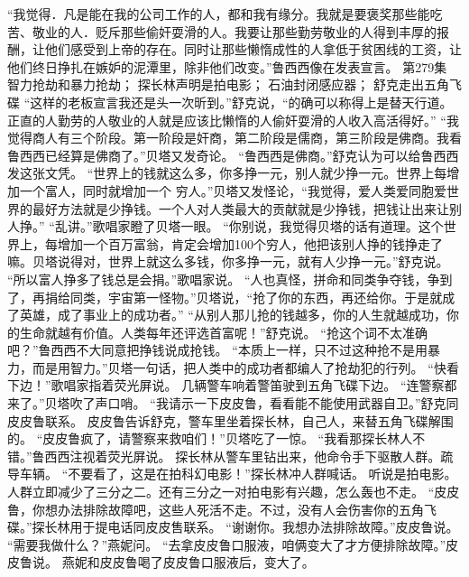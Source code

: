 \documentclass[a4paper,12pt,UTF8,twoside]{ctexbook}
\begin{document}
        “我觉得．凡是能在我的公司工作的人，都和我有缘分。我就是要褒奖那些能吃苦、敬业的人．贬斥那些偷奸耍滑的人。我要让那些勤劳敬业的人得到丰厚的报酬，让他们感受到上帝的存在。同时让那些懒惰成性的人拿低于贫困线的工资，让他们终日挣扎在嫉妒的泥潭里，除非他们改变。”鲁西西像在发表宣言。          第279集  
        智力抢劫和暴力抢劫；  
        探长林声明是拍电影；  
        石油封闭感应器；  
        舒克走出五角飞碟    
        “这样的老板宣言我还是头一次昕到。”舒克说，“的确可以称得上是替天行道。正直的人勤劳的人敬业的人就是应该比懒惰的人偷奸耍滑的人收入高活得好。”  
        “我觉得商人有三个阶段。第一阶段是奸商，第二阶段是儒商，第三阶段是佛商。我看鲁西西已经算是佛商了。”贝塔又发奇论。  
        “鲁西西是佛商。”舒克认为可以给鲁西西发这张文凭。  
        “世界上的钱就这么多，你多挣一元，别人就少挣一元。世界上每增加一个富人，同时就增加一个        穷人。”贝塔又发怪论，“我觉得，爱人类爱同胞爱世界的最好方法就是少挣钱。一个人对人类最大的贡献就是少挣钱，把钱让出来让别人挣。”  
        “乱讲。”歌唱家瞪了贝塔一眼。  
        “你别说，我觉得贝塔的话有道理。这个世界上，每增加一个百万富翁，肯定会增加100个穷人，他把该别人挣的钱挣走了嘛。贝塔说得对，世界上就这么多钱，你多挣一元，就有人少挣一元。”舒克说。  
        “所以富人挣多了钱总是会捐。”歌唱家说。  
        “人也真怪，拼命和同类争夺钱，争到了，再捐给同类，宇宙第一怪物。”贝塔说，“抢了你的东西，再还给你。于是就成了英雄，成了事业上的成功者。”  
        “从别人那儿抢的钱越多，你的人生就越成功，你的生命就越有价值。人类每年还评选首富呢！”舒克说。  
        “抢这个词不太准确吧？”鲁西西不大同意把挣钱说成抢钱。  
        “本质上一样，只不过这种抢不是用暴力，而是用智力。”贝塔一句话，把人类中的成功者都编人了抢劫犯的行列。  
        “快看下边！”歌唱家指着荧光屏说。  
        几辆警车响着警笛驶到五角飞碟下边。        
        “连警察都来了。”贝塔吹了声口哨。  
        “我请示一下皮皮鲁，看看能不能使用武器自卫。”舒克同皮皮鲁联系。  
        皮皮鲁告诉舒克，警车里坐着探长林，自己人，来替五角飞碟解围的。  
        “皮皮鲁疯了，请警察来救咱们！”贝塔吃了一惊。  
        “我看那探长林人不错。”鲁西西注视着荧光屏说。  
        探长林从警车里钻出来，他命令手下驱散人群。疏导车辆。  
        “不要看了，这是在拍科幻电影！”探长林冲人群喊话。  
        听说是拍电影。人群立即减少了三分之二。还有三分之一对拍电影有兴趣，怎么轰也不走。  
        “皮皮鲁，你想办法排除故障吧，这些人死活不走。不过，没有人会伤害你的五角飞碟。”探长林用于提电话同皮皮售联系。  
        “谢谢你。我想办法排除故障。”皮皮鲁说。  
        “需要我做什么？”燕妮问。  
        “去拿皮皮鲁口服液，咱俩变大了才方便排除故障。”皮皮鲁说。  
        燕妮和皮皮鲁喝了皮皮鲁口服液后，变大了。  
\end{document}

